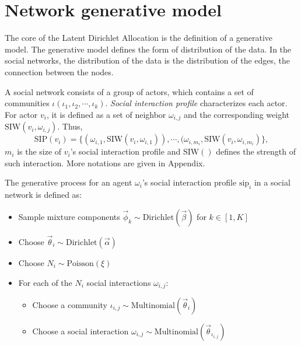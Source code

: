 \documentclass[letterpaper]{article}
\begin{document}
\section{Network generative model}

The core of the Latent Dirichlet Allocation is the definition of a generative model.
The generative model defines the form of distribution of the data.
In the social networks, the distribution of the data is the distribution of the edges, the connection between the nodes.

A social network consists of a group of actors, which contains a set of communities $ \iota( \iota_{1} , \iota_{2} , \cdots , \iota_{k} ) $.
\emph{Social interaction profile} characterizes each actor.
For actor $ v_{i} $, it is defined as a set of neighbor $ \omega_{i,j} $ and the corresponding weight $ \mbox{SIW}(v_{i}, \omega_{i,j}) $.
Thus,
\begin{equation}
\mbox{SIP}(v_{i}) = \{ (\omega_{i,1}, \mbox{SIW}(v_{i}, \omega_{i,1})) , \cdots , (\omega_{i,m_{i}}, \mbox{SIW}(v_{i}, \omega_{i,m_{i}}) \},
\end{equation}
$ m_{i} $ is the size of $ v_{i} $'s social interaction profile and $ \mbox{SIW}() $ defines the strength of such interaction.
More notations are given in Appendix.

The generative process for an agent $ \omega_{i} $'s social interaction profile $ \mbox{sip}_{i} $ in a social network is defined as:
\begin{itemize}
	\item Sample mixture components $ \vec{\phi}_{k} \sim \mbox{Dirichlet}(\vec{\beta}) $ for $ k \in [1, K] $
	\item Choose $ \vec{\theta}_{i} \sim \mbox{Dirichlet}(\vec{\alpha}) $ 
	\item Choose $ N_{i}  \sim \mbox{Poisson}(\xi) $
	\item For each of the $ N_{i} $ social interactions $ \omega_{i,j} $:
	\begin{itemize}
		\item Choose a community $ \iota_{i,j} \sim \mbox{Multinomial}( \vec{\theta}_{i} ) $
		\item Choose a social interaction $ \omega_{i,j} \sim \mbox{Multinomial}( \vec{\theta}_{\iota_{i,j}} ) $	
	\end{itemize}
\end{itemize}
\end{document}
